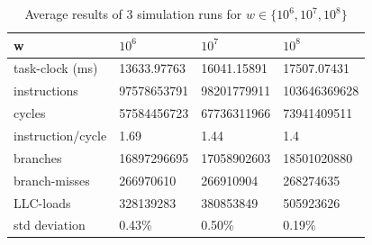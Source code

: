 \begin{table}[h]
\centering
\caption{Average results of 3 simulation runs for $ w \in \{10^6, 10^7, 10^8\}$}
\label{tab:res2}
\begin{tabular}{|l|l|l|l|}
\hline
w                 & $10^6$      & $10^7$      & $10^8$       \\ \hline
task-clock (ms)   & 13633.97763 & 16041.15891 & 17507.07431  \\ \hline
instructions      & 97578653791 & 98201779911 & 103646369628 \\ \hline
cycles            & 57584456723 & 67736311966 & 73941409511  \\ \hline
instruction/cycle & 1.69        & 1.44        & 1.4          \\ \hline
branches          & 16897296695 & 17058902603 & 18501020880  \\ \hline
branch-misses     & 266970610   & 266910904   & 268274635    \\ \hline
LLC-loads         & 328139283   & 380853849   & 505923626    \\ \hline
std deviation     & 0.43\%      & 0.50\%      & 0.19\%       \\ \hline
\end{tabular}%
\end{table}


